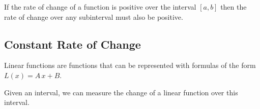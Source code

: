 \documentclass{ximera}
\begin{document}
\begin{question}
If the rate of change of a function is positive over the interval $[a,b]$ then the rate of change over any subinterval must also be positive.
    \begin{multipleChoice}
    \end{multipleChoice}
\end{question}




















\subsection*{Constant Rate of Change}


Linear functions are functions that can be represented with formulas of the form $L(x) = A \, x + B$. 


Given an interval, we can measure the change of a linear function over this interval. 
\end{document}
